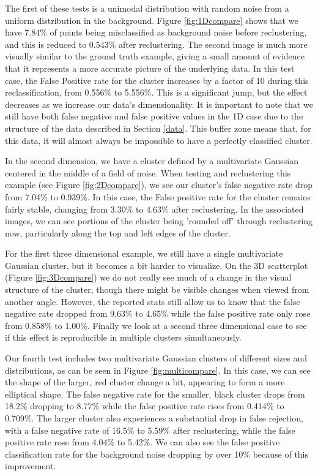 \documentclass{sig-alternate-05-2015}
\begin{document}
The first of these tests is a unimodal distribution with random noise from a uniform distribution in the background. Figure \ref{fig:1Dcompare} shows that we have 7.84\% of points being misclassified as background noise before reclustering, and this is reduced to 0.543\% after reclustering. The second image is much more visually similar to the ground truth example, giving a small amount of evidence that it represents a more accurate picture of the underlying data. In this test case, the False Positive rate for the cluster increases by a factor of 10 during this reclassification, from 0.556\% to 5.556\%. This is a significant jump, but the effect decreases as we increase our data's dimensionality. It is important to note that we still have both false negative and false positive values in the 1D case due to the structure of the data described in Section \ref{data}. This buffer zone means that, for this data, it will almost always be impossible to have a perfectly classified cluster.

In the second dimension, we have a cluster defined by a multivariate Gaussian centered in the middle of a field of noise. When testing and reclustering this example (see Figure \ref{fig:2Dcompare}), we see our cluster's false negative rate drop from 7.04\% to 0.939\%. In this case, the False positive rate for the cluster remains fairly stable, changing from 3.30\% to 4.63\% after reclustering. In the associated images, we can see portions of the cluster being 'rounded off' through reclustering now, particularly along the top and left edges of the cluster.

For the first three dimensional example, we still have a single multivariate Gaussian cluster, but it becomes a bit harder to visualize. On the 3D scatterplot (Figure \ref{fig:3Dcompare}) we do not really see much of a change in the visual structure of the cluster, though there might be visible changes when viewed from another angle. However, the reported stats still allow us to know that the false negative rate dropped from 9.63\% to 4.65\% while the false positive rate only rose from 0.858\% to 1.00\%. Finally we look at a second three dimensional case to see if this effect is reproducible in multiple clusters simultaneously.

Our fourth test includes two multivariate Gaussian clusters of different sizes and distributions, as can be seen in Figure \ref{fig:multicompare}. In this case, we can see the shape of the larger, red cluster change a bit, appearing to form a more elliptical shape. The false negative rate for the smaller, black cluster drops from 18.2\% dropping to 8.77\% while the false positive rate rises from 0.414\% to 0.709\%. The larger cluster also experiences a substantial drop in false rejection, with a false negative rate of 16.5\% to 5.59\% after reclustering, while the false positive rate rose from 4.04\% to 5.42\%. We can also see the false positive classification rate for the background noise dropping by over 10\% because of this improvement.
\end{document}
